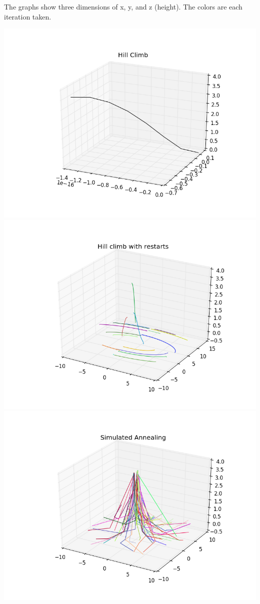 \documentclass[a4paper,12pt]{article}
\begin{document}
The graphs show three dimensions of x, y, and z (height). The colors are each iteration taken.

\centering
\includegraphics[scale=0.6]{hill_climb}
\includegraphics[scale=0.6]{hill_climb_random}
\includegraphics[scale=0.6]{simulated_annealing}
\end{document}
